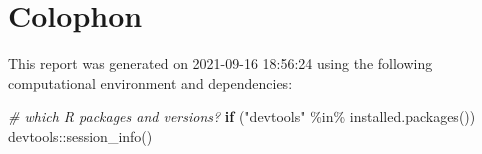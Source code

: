 \documentclass[
]{article}
\newenvironment{Shaded}{\begin{snugshade}}{\end{snugshade}}
\newcommand{\CommentTok}[1]{\textcolor[rgb]{0.56,0.35,0.01}{\textit{#1}}}
\newcommand{\ControlFlowTok}[1]{\textcolor[rgb]{0.13,0.29,0.53}{\textbf{#1}}}
\newcommand{\FunctionTok}[1]{\textcolor[rgb]{0.00,0.00,0.00}{#1}}
\newcommand{\NormalTok}[1]{#1}
\newcommand{\SpecialCharTok}[1]{\textcolor[rgb]{0.00,0.00,0.00}{#1}}
\newcommand{\StringTok}[1]{\textcolor[rgb]{0.31,0.60,0.02}{#1}}
\begin{document}
\hypertarget{colophon}{%
\section{Colophon}\label{colophon}}

This report was generated on 2021-09-16 18:56:24 using the following computational environment and dependencies:

\begin{Shaded}
\begin{Highlighting}[]
\CommentTok{\# which R packages and versions?}
\ControlFlowTok{if}\NormalTok{ (}\StringTok{"devtools"} \SpecialCharTok{\%in\%} \FunctionTok{installed.packages}\NormalTok{()) devtools}\SpecialCharTok{::}\FunctionTok{session\_info}\NormalTok{()}
\end{Highlighting}
\end{Shaded}
\end{document}
